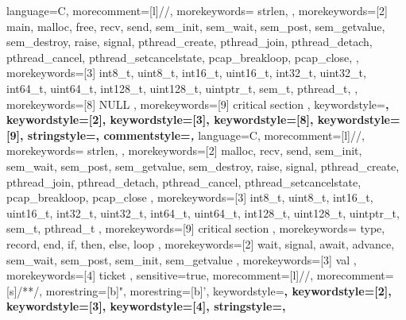 %
%
\lstset{
	emph={%
    	critical,
    	section
    },
    emphstyle={\color{red}\bfseries}%
}%
{
    language=C,
    morecomment=[l]{//},
    morekeywords={
        strlen,
    },
    morekeywords=[2]{
        main,
        malloc,
        free,
        recv,
        send,
        sem_init,
        sem_wait,
        sem_post,
        sem_getvalue,
        sem_destroy,
        raise,
        signal,
        pthread_create,
        pthread_join,
        pthread_detach,
        pthread_cancel,
        pthread_setcancelstate,
        pcap_breakloop,
        pcap_close,
    },
    morekeywords=[3]{
        int8_t,
        uint8_t,
        int16_t,
        uint16_t,
        int32_t,
        uint32_t,
        int64_t,
        uint64_t,
        int128_t,
        uint128_t,
        uintptr_t,
        sem_t,
        pthread_t,
    },
    morekeywords=[8]{
        NULL
    },
    morekeywords=[9]{
        critical section
    },
    keywordstyle=\color{eclipse_keyword1}\bfseries,
    keywordstyle=[2]\color{eclipse_keyword2}\bfseries,
    keywordstyle=[3]\color{eclipse_keyword3}\bfseries,
    keywordstyle=[8]\color{eclipse_keyword1},
    keywordstyle=[9]\color{red}\bfseries,
    stringstyle=\color{eclipse_string},
    commentstyle=\color{eclipse_comment}\itshape,
}
{
	language=C,
	morecomment=[l]{//},
	morekeywords={
		strlen,
	},
	morekeywords=[2]{
		malloc,
		recv,
		send,
		sem_init,
		sem_wait,
		sem_post,
		sem_getvalue,
		sem_destroy,
		raise,
		signal,
		pthread_create,
		pthread_join,
		pthread_detach,
		pthread_cancel,
		pthread_setcancelstate,
		pcap_breakloop,
		pcap_close
	},
	morekeywords=[3]{
		int8_t,
		uint8_t,
		int16_t,
		uint16_t,
		int32_t,
		uint32_t,
		int64_t,
		uint64_t,
		int128_t,
		uint128_t,
		uintptr_t,
		sem_t,
		pthread_t
	},
	morekeywords=[9]{
		critical section
	},
}
{
	morekeywords={
		type,
		record,
		end,
		if,
		then,
		else,
		loop
	},
	morekeywords=[2]{
		wait,
		signal,
		await,
		advance,
		sem_wait,
		sem_post,
		sem_init,
		sem_getvalue
	},
	morekeywords=[3]{
		val
	},
	morekeywords=[4]{
		ticket
	},
	sensitive=true,
	morecomment=[l]{//},
	morecomment=[s]{/*}{*/},
	morestring=[b]",
	morestring=[b]',
	keywordstyle=\bfseries\ttfamily\color{blue},
	keywordstyle=[2]\bfseries\ttfamily\color{teal},
	keywordstyle=[3]\bfseries\ttfamily\color{olive},
	keywordstyle=[4]\bfseries\ttfamily\color{olive},
	stringstyle=\color{green}\ttfamily,
}
%

